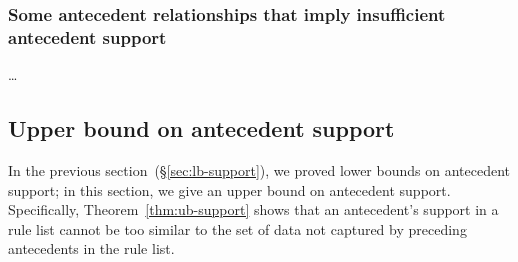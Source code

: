 \subsubsection{Some antecedent relationships that imply insufficient antecedent support}

\dots

\subsection{Upper bound on antecedent support}
\label{sec:ub-support}

In the previous section~(\S\ref{sec:lb-support}), we proved lower bounds
on antecedent support; in this section, we give an upper bound on
antecedent support.
%
Specifically, Theorem~\ref{thm:ub-support} shows that an antecedent's
support in a rule list cannot be too similar to the set of data not
captured by preceding antecedents in the rule list.

